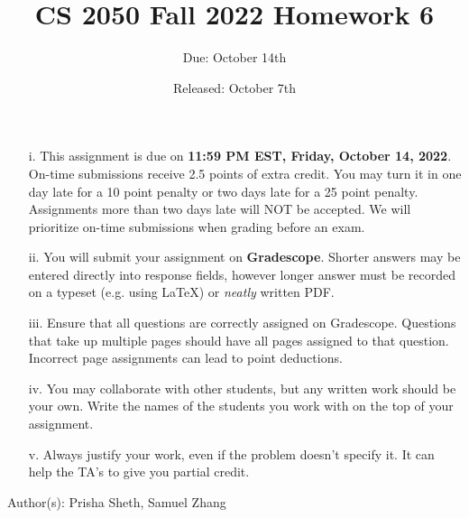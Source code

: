 \documentclass{article}
\title{CS 2050 Fall 2022 Homework 6}
\author{Due: October 14th}
\date{Released: October 7th}
\begin{document}
\maketitle

\begin{enumerate}
    \item[i.] This assignment is due on \textbf{11:59 PM EST, Friday, October 14, 2022}.  On-time submissions receive 2.5 points of extra credit. You may turn it in one day late for a 10 point penalty or two days late for a 25 point penalty. Assignments more than two days late will NOT be accepted.  We will prioritize on-time submissions when grading before an exam.
    \item[ii.] You will submit your assignment on \textbf{Gradescope}. Shorter answers may be entered directly into response fields, however longer answer must be recorded on a typeset (e.g. using \LaTeX) or \emph{neatly} written PDF.
    \item[iii.] Ensure that all questions are correctly assigned on Gradescope. Questions that take up multiple pages should have all pages assigned to that question. Incorrect page assignments can lead to point deductions.
    \item[iv.] You may collaborate with other students, but any written work should be your own. Write the names of the students you work with on the top of your assignment.
    \item[v.] Always justify your work, even if the problem doesn't specify it. It can help the TA's to give you partial credit.
\end{enumerate}

Author(s): Prisha Sheth, Samuel Zhang

\clearpage
\end{document}
